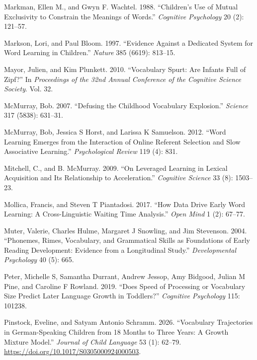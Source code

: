 \documentclass[
  11pt,
]{article}
\newlength{\cslhangindent}
\newenvironment{CSLReferences}[2] %
 {\begin{list}{}{%
  \setlength{\itemindent}{0pt}
  \setlength{\leftmargin}{0pt}
  \setlength{\parsep}{0pt}
  \ifodd #1
   \setlength{\leftmargin}{\cslhangindent}
   \setlength{\itemindent}{-1\cslhangindent}
  \fi
  \setlength{\itemsep}{#2\baselineskip}}}
 {\end{list}}
\begin{document}
\begin{CSLReferences}{1}{0}
Markman, Ellen M., and Gwyn F. Wachtel. 1988. {``Children's Use of
Mutual Exclusivity to Constrain the Meanings of Words.''}
\emph{Cognitive Psychology} 20 (2): 121--57.

Markson, Lori, and Paul Bloom. 1997. {``Evidence Against a Dedicated
System for Word Learning in Children.''} \emph{Nature} 385 (6619):
813--15.

Mayor, Julien, and Kim Plunkett. 2010. {``Vocabulary Spurt: Are Infants
Full of {Zipf}?''} In \emph{Proceedings of the 32nd Annual Conference of
the Cognitive Science Society}. Vol. 32.

McMurray, Bob. 2007. {``Defusing the Childhood Vocabulary Explosion.''}
\emph{Science} 317 (5838): 631--31.

McMurray, Bob, Jessica S Horst, and Larissa K Samuelson. 2012. {``Word
Learning Emerges from the Interaction of Online Referent Selection and
Slow Associative Learning.''} \emph{Psychological Review} 119 (4): 831.

Mitchell, C., and B. McMurray. 2009. {``On Leveraged Learning in Lexical
Acquisition and Its Relationship to Acceleration.''} \emph{Cognitive
Science} 33 (8): 1503--23.

Mollica, Francis, and Steven T Piantadosi. 2017. {``How Data Drive Early
Word Learning: A Cross-Linguistic Waiting Time Analysis.''} \emph{Open
Mind} 1 (2): 67--77.

Muter, Valerie, Charles Hulme, Margaret J Snowling, and Jim Stevenson.
2004. {``Phonemes, Rimes, Vocabulary, and Grammatical Skills as
Foundations of Early Reading Development: Evidence from a Longitudinal
Study.''} \emph{Developmental Psychology} 40 (5): 665.

Peter, Michelle S, Samantha Durrant, Andrew Jessop, Amy Bidgood, Julian
M Pine, and Caroline F Rowland. 2019. {``Does Speed of Processing or
Vocabulary Size Predict Later Language Growth in Toddlers?''}
\emph{Cognitive Psychology} 115: 101238.

Pinstock, Eveline, and Satyam Antonio Schramm. 2026. {``Vocabulary
Trajectories in {German}-Speaking Children from 18 Months to Three
Years: A Growth Mixture Model.''} \emph{Journal of Child Language} 53
(1): 62--79. \url{https://doi.org/10.1017/S0305000924000503}.


\end{CSLReferences}
\end{document}
